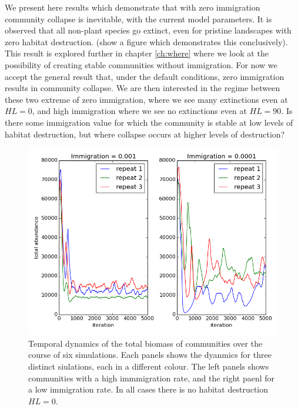 We present here results which demonstrate that with zero immigration community collapse is inevitable, with the current model parameters. It is observed that all non-plant species go extinct, even for pristine landscapes with zero habitat destruction. (show a figure which demonstrates this conclusively). This result is explored further in chapter \ref{ch:where} where we look at the possibility of creating stable communities without immigration. For now we accept the general result that, under the default conditions, zero immigration results in community collapse. We are then interested in the regime between these two extreme of zero immigration, where we see many extinctions even at $HL=0$, and high immigration where we see no extinctions even at $HL=90$. Is there some immigration value for which the community is stable at low levels of habitat destruction, but where collapse occurs at higher levels of destruction?




\begin{figure}[h!]
	\centering	
	\includegraphics[width=0.8\linewidth]{"./chapters/chapter04/figures/total_biomass_dynamics_hl_0_mai_0"}
	\caption{Temporal dynamics of the total biomass of communities over the course of six simulations. Each panels shows the dyanmics for three distinct siulations, each in a different colour. The left panels shows communities with a high immmigration rate, and the right paenl for a low immigration rate. In all cases there is no habitat destruction $HL=0$.}
	\label{fig:total_biomass_dynamics}
\end{figure}

